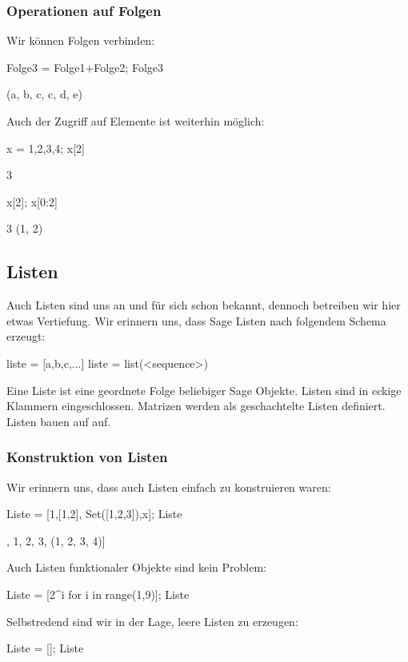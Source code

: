 \documentclass[fontsize=12pt,paper=a4,twoside,bibtotoc,idxtotoc,
liststotoc,pagesize,BCOR1.2cm,DIV15,chapterprefix,pagesize=pdftex]{scrbook}
\theoremstyle{plain}
\theoremstyle{definition}
\theoremstyle{remark}
\begin{document}
\subsubsection{Operationen auf Folgen}
Wir können Folgen verbinden:
\begin{sagein}
Folge3 = Folge1+Folge2; Folge3
\end{sagein}
\begin{sage}
(a, b, c, c, d, e)
\end{sage}
Auch der Zugriff auf Elemente ist weiterhin möglich:
\begin{sagein}
x = 1,2,3,4; x[2] 
\end{sagein}
\begin{sage}
  3
\end{sage}
\begin{sagein}
x[2]; x[0:2]
\end{sagein}
\begin{sage}
3
(1, 2)
\end{sage}

\subsection{Listen}
Auch Listen sind uns an und für sich schon bekannt, dennoch betreiben wir hier etwas Vertiefung. Wir erinnern uns, dass Sage Listen nach folgendem Schema erzeugt:
\begin{sagein}
liste = [a,b,c,...] 
liste = list(<sequence>)
\end{sagein}
Eine Liste ist eine geordnete Folge beliebiger Sage Objekte. Listen sind in eckige Klammern eingeschlossen. Matrizen werden als geschachtelte Listen definiert. 
Listen bauen auf  auf. 
\subsubsection{Konstruktion von Listen}
Wir erinnern uns, dass auch Listen einfach zu konstruieren waren:
\begin{sagein}
Liste = [1,[1,2], Set([1,2,3]),x]; Liste
\end{sagein}
\begin{sage}
[1, [1, 2], {1, 2, 3}, (1, 2, 3, 4)]
\end{sage}
Auch Listen funktionaler Objekte sind kein Problem:
\begin{sagein}
Liste = [2^i for i in range(1,9)]; Liste
\end{sagein}
\begin{sage}
[2, 4, 8, 16, 32, 64, 128, 256]
\end{sage}
Selbstredend sind wir in der Lage, leere Listen zu erzeugen:
\begin{sagein}
Liste = []; Liste
\end{sagein}
\begin{sage}
  []
\end{sage}
\end{document}
